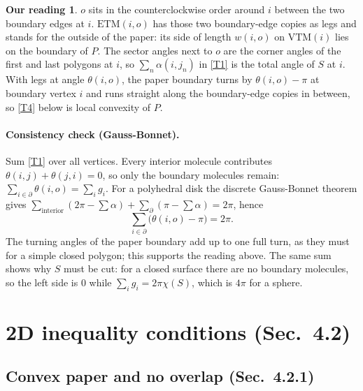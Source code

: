 \documentclass[11pt]{article}
\theoremstyle{definition}
\newtheorem*{reading}{Our reading}
\newcommand{\ETM}{\mathrm{ETM}}
\newcommand{\VTM}{\mathrm{VTM}}
\begin{document}
\begin{reading}
$o$ sits in the counterclockwise order around $i$ between the two boundary
edges at $i$. $\ETM(i,o)$ has those two boundary-edge copies as legs and stands
for the outside of the paper: its side of length $w(i,o)$ on $\VTM(i)$ lies on
the boundary of $P$. The sector angles next to $o$ are the corner angles of the
first and last polygons at $i$, so $\sum_n \alpha(i,j_n)$ in \eqref{T1} is the
total angle of $S$ at $i$. With legs at angle $\theta(i,o)$, the paper boundary
turns by $\theta(i,o) - \pi$ at boundary vertex $i$ and runs straight along the
boundary-edge copies in between, so \eqref{T4} below is local convexity of $P$.
\end{reading}

\paragraph{Consistency check (Gauss-Bonnet).} Sum \eqref{T1} over all vertices.
Every interior molecule contributes $\theta(i,j) + \theta(j,i) = 0$, so only the
boundary molecules remain:
$\sum_{i \in \partial} \theta(i,o) = \sum_i g_i$. For a polyhedral disk the
discrete Gauss-Bonnet theorem gives
$\sum_{\text{interior}} (2\pi - \sum\alpha) + \sum_{\partial} (\pi - \sum\alpha) = 2\pi$,
hence
\begin{equation}
  \sum_{i \in \partial} \bigl(\theta(i,o) - \pi\bigr) = 2\pi .
  \label{eq:gaussbonnet}
\end{equation}
The turning angles of the paper boundary add up to one full turn, as they must
for a simple closed polygon; this supports the reading above. The same sum
shows why $S$ must be cut: for a closed surface there are no boundary molecules,
so the left side is $0$ while $\sum_i g_i = 2\pi\chi(S)$, which is $4\pi$ for a
sphere.

\section{2D inequality conditions (Sec.~4.2)}\label{sec:2d}

\subsection{Convex paper and no overlap (Sec.~4.2.1)}
\end{document}
